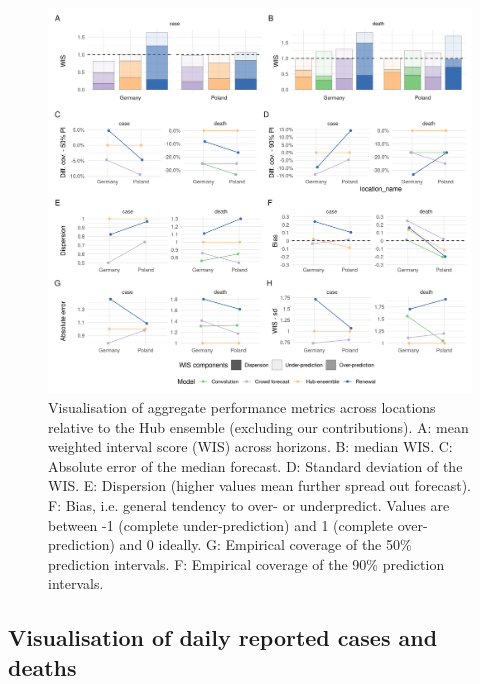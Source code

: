 \documentclass[
]{article}
\begin{document}
\begin{figure}[H]
\includegraphics[width=1\linewidth,]{../analysis/plots/aggregate-performance-2-weeks-locations-all-rel-v4} \caption{ Visualisation of aggregate performance metrics across locations relative to the Hub ensemble (excluding our contributions). A: mean weighted interval score (WIS) across horizons. B: median WIS. C: Absolute error of the median forecast. D: Standard deviation of the WIS. E: Dispersion (higher values mean further spread out forecast). F: Bias, i.e. general tendency to over- or underpredict. Values are between -1 (complete under-prediction) and 1 (complete over-prediction) and 0 ideally. G: Empirical coverage of the 50\% prediction intervals. F: Empirical coverage of the 90\% prediction intervals.}\label{fig:performance-locations-rel}
\end{figure}

\clearpage

\hypertarget{visualisation-of-daily-reported-cases-and-deaths}{%
\subsection{Visualisation of daily reported cases and deaths}\label{visualisation-of-daily-reported-cases-and-deaths}}
\end{document}
